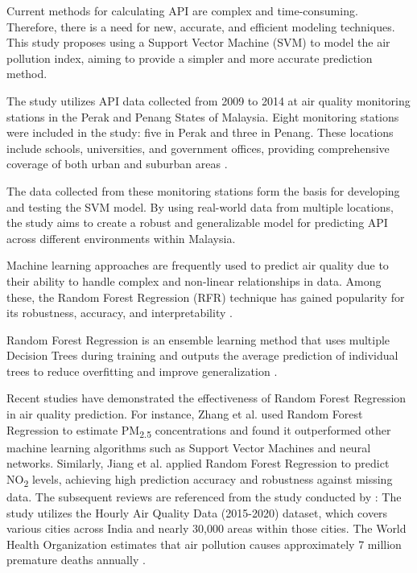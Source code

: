 \documentclass{book}
\numberwithin{equation}{section}
\numberwithin{figure}{section}
\begin{document}
Current methods for calculating API are complex and time-consuming. Therefore, there is a need for new, accurate, and efficient modeling techniques. This study proposes using a Support Vector Machine (SVM) to model the air pollution index, aiming to provide a simpler and more accurate prediction method.

The study utilizes API data collected from 2009 to 2014 at air quality monitoring stations in the Perak and Penang States of Malaysia. Eight monitoring stations were included in the study: five in Perak and three in Penang. These locations include schools, universities, and government offices, providing comprehensive coverage of both urban and suburban areas \citep{leong2019prediction}.

The data collected from these monitoring stations form the basis for developing and testing the SVM model. By using real-world data from multiple locations, the study aims to create a robust and generalizable model for predicting API across different environments within Malaysia.

Machine learning approaches are frequently used to predict air quality due to their ability to handle complex and non-linear relationships in data. Among these, the Random Forest Regression (RFR) technique has gained popularity for its robustness, accuracy, and interpretability \citep{breiman2001random}.

Random Forest Regression is an ensemble learning method that uses multiple Decision Trees during training and outputs the average prediction of individual trees to reduce overfitting and improve generalization \citep{liaw2002classification}.

Recent studies have demonstrated the effectiveness of Random Forest Regression in air quality prediction. For instance, Zhang et al. \citep{zhang2017hybrid} used Random Forest Regression to estimate PM\textsubscript{2.5} concentrations and found it outperformed other machine learning algorithms such as Support Vector Machines and neural networks. Similarly, Jiang et al. \citep{jiang2020hybrid} applied Random Forest Regression to predict NO\textsubscript{2} levels, achieving high prediction accuracy and robustness against missing data.
The subsequent reviews are referenced from the study conducted by \citep{gaikar2023prediction}:
The study utilizes the Hourly Air Quality Data (2015-2020) dataset, which covers various cities across India and nearly 30,000 areas within those cities. The World Health Organization estimates that air pollution causes approximately 7 million premature deaths annually .
\end{document}

